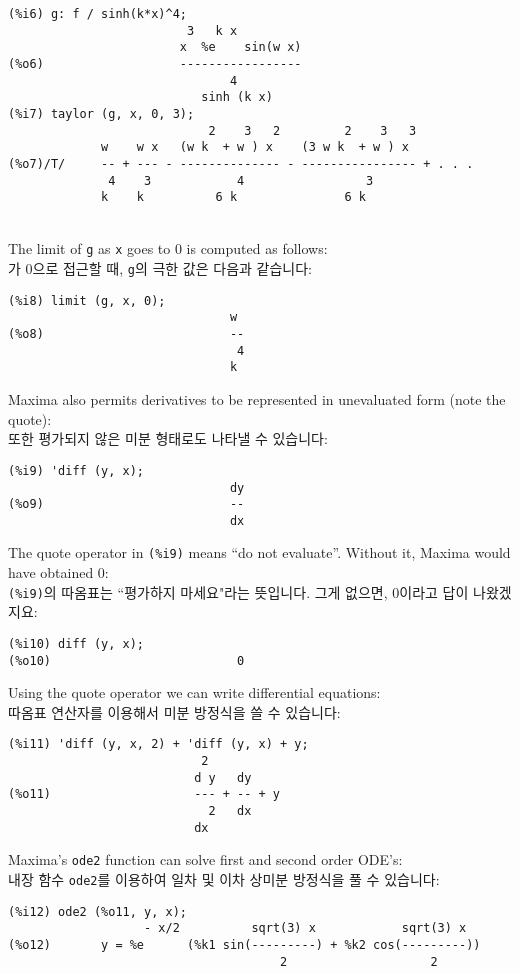 \documentclass[a4paper,12pt]{article}
\begin{document}
\noindent\begin{minipage}{\textwidth} 
\begin{verbatim}
(%i6) g: f / sinh(k*x)^4;
                         3   k x
                        x  %e    sin(w x)
(%o6)                   -----------------
                               4
                           sinh (k x)
(%i7) taylor (g, x, 0, 3);
                            2    3   2         2    3   3
             w    w x   (w k  + w ) x    (3 w k  + w ) x
(%o7)/T/     -- + --- - -------------- - ---------------- + . . .
              4    3            4                 3
             k    k          6 k               6 k
\end{verbatim}
\end{minipage} \\

The limit of {\tt g} as {\tt x} goes to 0 is computed as follows: \\
가 0으로 접근할 때, {\tt g}의 극한 값은 다음과 같습니다:
\begin{verbatim}
(%i8) limit (g, x, 0);
                               w
(%o8)                          --
                                4
                               k
\end{verbatim}
Maxima also permits derivatives to be represented in unevaluated form 
(note the quote): \\
또한 평가되지 않은 미분 형태로도 나타낼 수 있습니다:
\begin{verbatim}
(%i9) 'diff (y, x);
                               dy
(%o9)                          --
                               dx
\end{verbatim}
The quote operator in {\tt (\%i9)} means ``do not evaluate''.  Without 
it, Maxima would have obtained 0: \\
{\tt (\%i9)}의 따옴표는 ``평가하지 마세요"라는 뜻입니다. 
그게 없으면, 0이라고 답이 나왔겠지요:
\begin{verbatim}
(%i10) diff (y, x);
(%o10)                          0
\end{verbatim}
Using the quote operator we can write differential equations: \\
따옴표 연산자를 이용해서 미분 방정식을 쓸 수 있습니다:
\begin{verbatim}
(%i11) 'diff (y, x, 2) + 'diff (y, x) + y;
                           2
                          d y   dy
(%o11)                    --- + -- + y
                            2   dx
                          dx
\end{verbatim}
Maxima's {\tt ode2} function can solve first and second order ODE's: \\
내장 함수 {\tt ode2}를 이용하여 일차 및 이차 상미분 방정식을 풀 수 있습니다:
\begin{verbatim}
(%i12) ode2 (%o11, y, x);
                   - x/2          sqrt(3) x            sqrt(3) x
(%o12)       y = %e      (%k1 sin(---------) + %k2 cos(---------))
                                      2                    2
\end{verbatim}
\end{document}
